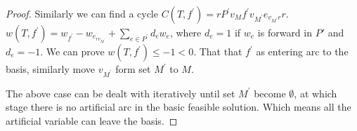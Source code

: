 \begin{proof}
                    Similarly we can find a cycle $C(T, f^\prime) = rP^\prime v_M f^\prime v_{M^\prime}e_{v_{M^\prime}r}r$. $w(T, f^\prime) = w_{f^\prime} - w_{e_{rv_{M^\prime}}} + \sum_{e \in P^\prime} d_e w_e$, where $d_e = 1$ if $w_e$ is forward in $P\prime$ and $d_e = -1$. We can prove $w(T, f^\prime) \le -1 < 0$. That that $f^\prime$ as entering arc to the basis, similarly move $v_{M^\prime}$ form set $M^\prime$ to $M$.

                    The above case can be dealt with iteratively until set $M^\prime$ become $\emptyset$, at which stage there is no artificial arc in the basic feasible solution. Which means all the artificial variable can leave the basis.
                \end{proof}





